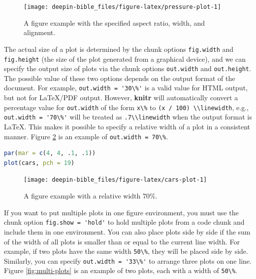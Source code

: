 \documentclass[doctor,openright,twoside]{sjtuthesis}
\newcommand{\passthrough}[1]{#1}
\theoremstyle{plain}
\theoremstyle{definition}
\theoremstyle{remark}
\theoremstyle{ocrenumbox}
\theoremstyle{plain}
\begin{document}
\begin{figure}

{\centering \texttt{[image: deepin-bible\_files/figure-latex/pressure-plot-1]} 

}

\caption[A figure example with the specified aspect ratio, width, and alignment]{A figure example with the specified aspect ratio, width, and alignment.}\label{fig:pressure-plot}
\end{figure}

The actual size of a plot is determined by the chunk options
\passthrough{\lstinline!fig.width!} and
\passthrough{\lstinline!fig.height!} (the size of the plot generated
from a graphical device), and we can specify the output size of plots
via the chunk options \passthrough{\lstinline!out.width!} and
\passthrough{\lstinline!out.height!}. The possible value of these two
options depends on the output format of the document. For example,
\passthrough{\lstinline!out.width = '30\%'!} is a valid value for HTML
output, but not for LaTeX/PDF output. However, \textbf{knitr} will
automatically convert a percentage value for
\passthrough{\lstinline!out.width!} of the form
\passthrough{\lstinline!x\%!} to
\passthrough{\lstinline!(x / 100) \\linewidth!}, e.g.,
\passthrough{\lstinline!out.width = '70\%'!} will be treated as
\passthrough{\lstinline!.7\\linewidth!} when the output format is LaTeX.
This makes it possible to specify a relative width of a plot in a
consistent manner. Figure \ref{fig:cars-plot} is an example of
\passthrough{\lstinline!out.width = 70\%!}.

\begin{lstlisting}[language=R]
par(mar = c(4, 4, .1, .1))
plot(cars, pch = 19)
\end{lstlisting}

\begin{figure}
\texttt{[image: deepin-bible\_files/figure-latex/cars-plot-1]} \caption[A figure example with a relative width 70\%]{A figure example with a relative width 70\%.}\label{fig:cars-plot}
\end{figure}

If you want to put multiple plots in one figure environment, you must
use the chunk option \passthrough{\lstinline!fig.show = 'hold'!} to hold
multiple plots from a code chunk and include them in one environment.
You can also place plots side by side if the sum of the width of all
plots is smaller than or equal to the current line width. For example,
if two plots have the same width \passthrough{\lstinline!50\%!}, they
will be placed side by side. Similarly, you can specify
\passthrough{\lstinline!out.width = '33\%'!} to arrange three plots on
one line. Figure \ref{fig:multi-plots} is an example of two plots, each
with a width of \passthrough{\lstinline!50\%!}.
\end{document}
